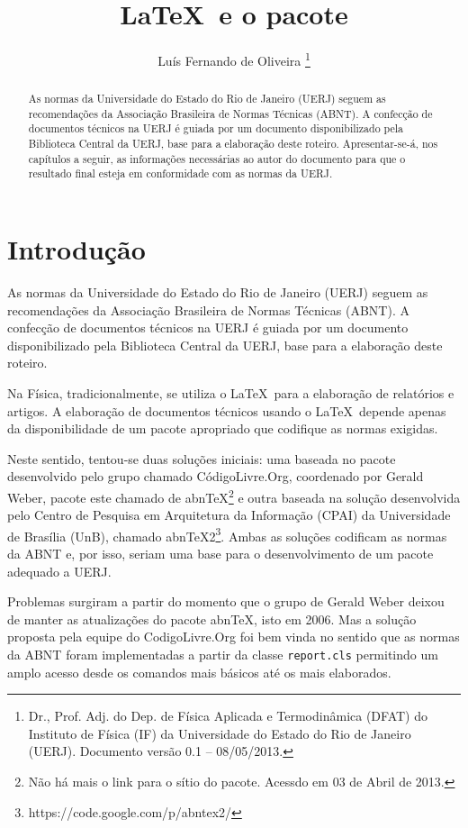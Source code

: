 \documentclass[a4paper,12pt,oneside,onecolumn]{article}
\title{\LaTeX\ e o pacote \repUERJ}
\author{Luís Fernando de Oliveira
  \thanks{Dr., Prof. Adj. do Dep. de Física Aplicada e Termodinâmica (DFAT) do Instituto de Física (IF) da Universidade do Estado do Rio de Janeiro (UERJ). Documento versão 0.1 -- 08/05/2013.
  }
}
\begin{document}
\maketitle

\begin{abstract}
\noindent As normas da Universidade do Estado do Rio de Janeiro (UERJ) seguem as recomendações da Associação Brasileira de Normas Técnicas (ABNT). A confecção de documentos técnicos na UERJ é guiada por um documento disponibilizado pela Biblioteca Central da UERJ, base para a elaboração deste roteiro.
Apresentar-se-á, nos capítulos a seguir, as informações necessárias ao autor do documento para que o resultado final esteja em conformidade com as normas da UERJ.
\end{abstract}

\tableofcontents

\section*{Introdução}

As normas da Universidade do Estado do Rio de Janeiro (UERJ) seguem as recomendações da Associação Brasileira de Normas Técnicas (ABNT). A confecção de documentos técnicos na UERJ é guiada por um documento disponibilizado pela Biblioteca Central da UERJ, base para a elaboração deste roteiro.

Na Física, tradicionalmente, se utiliza o \LaTeX\ para a elaboração de relatórios e artigos. A elaboração de documentos técnicos usando o \LaTeX\ depende apenas da disponibilidade de um pacote apropriado que codifique as normas exigidas.

Neste sentido, tentou-se duas soluções iniciais: uma baseada no pacote desenvolvido pelo grupo chamado CódigoLivre.Org, coordenado por Gerald Weber, pacote este chamado de abn\TeX\footnote{Não há mais o link para o sítio do pacote. Acessdo em 03 de Abril de 2013.} e outra baseada na solução desenvolvida pelo Centro de Pesquisa em Arquitetura da Informação (CPAI) da Universidade de Brasília (UnB), chamado abn\TeX2\footnote{https://code.google.com/p/abntex2/}. Ambas as soluções codificam as normas da ABNT e, por isso, seriam uma base para o desenvolvimento de um pacote adequado a UERJ.

Problemas surgiram a partir do momento que o grupo de Gerald Weber deixou de manter as atualizações do pacote abn\TeX, isto em 2006. Mas a solução proposta pela equipe do CodigoLivre.Org foi bem vinda no sentido que as normas da ABNT foram implementadas a partir da classe \texttt{report.cls} permitindo um amplo acesso desde os comandos mais básicos até os mais elaborados.
\end{document}
